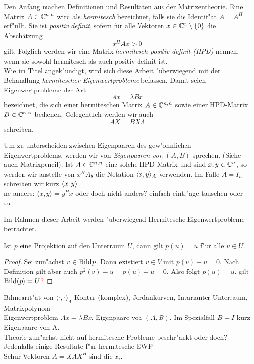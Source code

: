 Den Anfang machen Definitionen und Resultaten aus der Matrizentheorie.
Eine Matrix $A\in\Cnn$ wird als \emph{hermitesch} bezeichnet, falls
sie die Identit"at $A=A^H$ erf"ullt. Sie ist \emph{positiv definit}, sofern
für alle Vektoren $x\in\Co$ die Abschätzung
\[
x^H A x > 0
\]
gilt. Folglich werden wir eine Matrix \emph{hermitesch positiv definit (HPD)}
nennen, wenn sie sowohl hermitesch als auch positiv definit ist.\\

Wie im Titel angek"undigt, wird sich diese Arbeit "uberwiegend mit der Behandlung \emph{hermitescher Eigenwertprobleme} befassen. Damit seien Eigenwertprobleme der Art
\[
Ax = \lambda Bx
\]
bezeichnet, die sich einer hermiteschen Matrix $A\in\Cnn$ sowie einer HPD-Matrix $B\in\Cnn$ bedienen.
Gelegentlich werden wir auch
\[
AX = B X \Lambda
\]
schreiben.

Um zu unterscheiden zwischen Eigenpaaren des gew"ohnlichen Eigenwertproblems, werden wir von \emph{Eigenpaaren von} $(A,B)$ sprechen. (Siehe auch Matrixpencil).
Ist $A\in\Cnn$ eine solche HPD-Matrix und sind $x,y\in\Cn$, so werden wir anstelle von
$x^H A y$ die Notation $\sp{A}{x,y}$ verwenden. Im Falle $A=I_n$ schreiben wir
kurz $\sp{}{x,y}$.\\

ne anders: $\langle x,y \rangle = y^H x$ oder doch nicht anders? einfach eintr"age tauschen oder so

Im Rahmen dieser Arbeit werden "uberwiegend Hermitesche Eigenwertprobleme betrachtet.

\begin{prop}
Ist $p$ eine Projektion auf den Unterraum $U$, dann gilt $p(u) = u$ f"ur
alle $u \in U$.
\end{prop}
\begin{proof}
Sei zun"achst $u \in \Bild{p}$. Dann existiert $v \in V$ mit $p(v) - u = 0$.
Nach Definition gilt aber auch $p^2(v)-u = p(u)-u = 0$. Also folgt $p(u)=u$.
\textcolor{red}{gilt $\Bild(p) = U$?}
\end{proof}

Bilinearit"at von $\langle \cdot, \cdot \rangle_A$
Kontur (komplex), Jordankurven, Invarianter Unterraum, Matrixpolynom\\

Eigenwertproblem $Ax = \lambda Bx$. Eigenpaare von $(A,B)$. Im Spezialfall $B=I$ kurz Eigenpaare von A.\\

Theorie zun"achst nicht auf hermitesche Probleme beschr"ankt oder doch? Jedenfalls einige Resultate f"ur hermitesche EWP\\

Schur-Vektoren $A = X\Lambda X^H$ sind die $x_i$.
